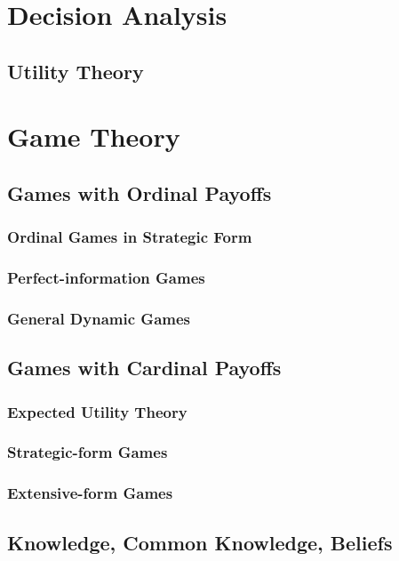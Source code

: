 

\part{Decision Analysis}
	\chapter{Utility Theory}

\part{Game Theory}
	\chapter{Games with Ordinal Payoffs}
		\section{Ordinal Games in Strategic Form}

		\section{Perfect-information Games}

		\section{General Dynamic Games}

	\chapter{Games with Cardinal Payoffs}
		\section{Expected Utility Theory}

		\section{Strategic-form Games}

		\section{Extensive-form Games}

	\chapter{Knowledge, Common Knowledge, Beliefs}
